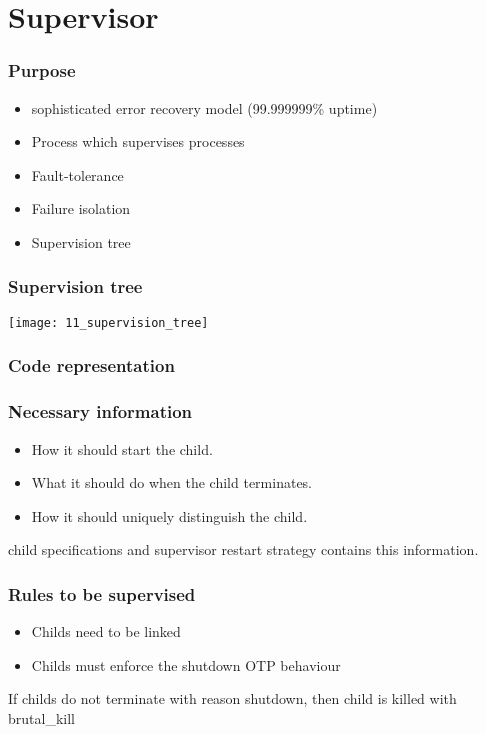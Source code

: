 \section{Supervisor}

\frame{\tableofcontents[currentsection]}

\begin{frame}
    \frametitle{Purpose}
    \begin{itemize}
        \item sophisticated error recovery model (99.999999\% uptime)
        \item Process which supervises processes
        \item Fault-tolerance
        \item Failure isolation
        \item Supervision tree
    \end{itemize}
\end{frame}

\begin{frame}
    \frametitle{Supervision tree}
    \texttt{[image: 11\_supervision\_tree]}
\end{frame}

\begin{frame}
    \frametitle{Code representation}
    \begin{center}
    \end{center}
\end{frame}

\begin{frame}
    \frametitle{Necessary information}

    \begin{itemize}
        \item How it should start the child.
        \item What it should do when the child terminates.
        \item How it should uniquely distinguish the child.
    \end{itemize}

    \vfill

    \footnotesize
    child specifications and supervisor restart strategy contains this information.
\end{frame}

\begin{frame}
    \frametitle{Rules to be supervised}

    \begin{itemize}
        \item Childs need to be linked
        \item Childs must enforce the shutdown OTP behaviour
    \end{itemize}

    \vfill

    \footnotesize
    If childs do not terminate with reason shutdown, then child is killed with brutal\_kill
\end{frame}